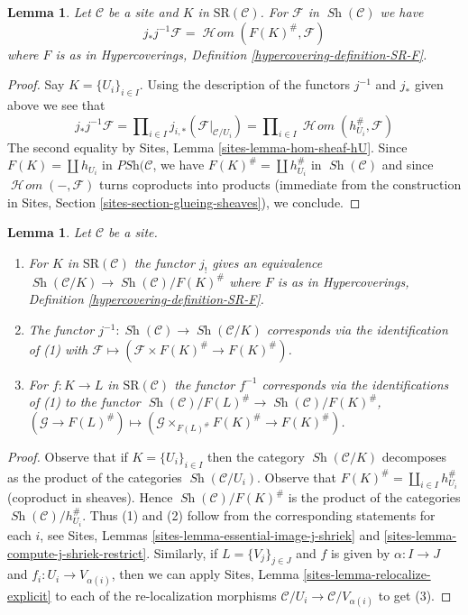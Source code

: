 \documentclass{stacks-project}
\theoremstyle{plain}
\newtheorem{lemma}[subsection]{Lemma}
\theoremstyle{definition}
\theoremstyle{remark}
\numberwithin{equation}{subsection}
\def\SheafHom{\mathop{\mathcal{H}\!\mathit{om}}\nolimits}
\def\Sh{\mathop{\mathit{Sh}}\nolimits}
\begin{document}
\begin{lemma}
\label{lemma-push-pull-localization}
Let $\mathcal{C}$ be a site and $K$ in $\text{SR}(\mathcal{C})$.
For $\mathcal{F}$ in $\Sh(\mathcal{C})$ we have
$$
j_*j^{-1}\mathcal{F} = \SheafHom(F(K)^\#, \mathcal{F})
$$
where $F$ is as in
Hypercoverings, Definition \ref{hypercovering-definition-SR-F}.
\end{lemma}

\begin{proof}
Say $K = \{U_i\}_{i \in I}$.
Using the description of the functors $j^{-1}$ and $j_*$
given above we see that
$$
j_*j^{-1}\mathcal{F} =
\prod\nolimits_{i \in I} j_{i, *}(\mathcal{F}|_{\mathcal{C}/U_i}) =
\prod\nolimits_{i \in I} \SheafHom(h_{U_i}^\#, \mathcal{F})
$$
The second equality by Sites, Lemma \ref{sites-lemma-hom-sheaf-hU}.
Since $F(K) = \coprod h_{U_i}$ in $\textit{PSh}(\mathcal{C}$,
we have $F(K)^\# = \coprod h_{U_i}^\#$ in $\Sh(\mathcal{C})$
and since $\SheafHom(-, \mathcal{F})$ turns coproducts into
products (immediate from the construction in
Sites, Section \ref{sites-section-glueing-sheaves}), we conclude.
\end{proof}

\begin{lemma}
\label{lemma-localize-compare}
Let $\mathcal{C}$ be a site.
\begin{enumerate}
\item For $K$ in $\text{SR}(\mathcal{C})$ the functor $j_!$
gives an equivalence $\Sh(\mathcal{C}/K) \to \Sh(\mathcal{C})/F(K)^\#$
where $F$ is as in
Hypercoverings, Definition \ref{hypercovering-definition-SR-F}.
\item The functor $j^{-1} : \Sh(\mathcal{C}) \to \Sh(\mathcal{C}/K)$
corresponds via the identification of (1) with
$\mathcal{F} \mapsto (\mathcal{F} \times F(K)^\# \to F(K)^\#)$.
\item For $f : K \to L$ in $\text{SR}(\mathcal{C})$ the functor
$f^{-1}$ corresponds via the identifications of (1) to the functor
$\Sh(\mathcal{C})/F(L)^\# \to \Sh(\mathcal{C})/F(K)^\#$,
$(\mathcal{G} \to F(L)^\#) \mapsto
(\mathcal{G} \times_{F(L)^\#} F(K)^\# \to F(K)^\#)$.
\end{enumerate}
\end{lemma}

\begin{proof}
Observe that if $K = \{U_i\}_{i \in I}$ then the category
$\Sh(\mathcal{C}/K)$ decomposes as the product of the categories
$\Sh(\mathcal{C}/U_i)$. Observe that
$F(K)^\# = \coprod_{i \in I} h_{U_i}^\#$ (coproduct in sheaves).
Hence $\Sh(\mathcal{C})/F(K)^\#$ is the product of the
categories $\Sh(\mathcal{C})/h_{U_i}^\#$.
Thus (1) and (2) follow from the corresponding
statements for each $i$, see
Sites, Lemmas \ref{sites-lemma-essential-image-j-shriek} and
\ref{sites-lemma-compute-j-shriek-restrict}.
Similarly, if $L = \{V_j\}_{j \in J}$ and $f$ is given
by $\alpha : I \to J$ and $f_i : U_i \to V_{\alpha(i)}$,
then we can apply
Sites, Lemma \ref{sites-lemma-relocalize-explicit}
to each of the re-localization morphisms
$\mathcal{C}/U_i \to \mathcal{C}/V_{\alpha(i)}$
to get (3).
\end{proof}
\end{document}
